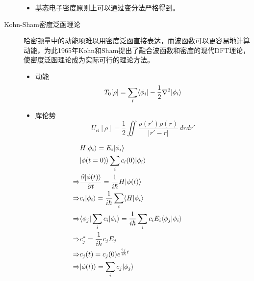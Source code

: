\begin{description}
\begin{itemize}
		\item 基态电子密度原则上可以通过变分法严格得到。

	\end{itemize}

	\item[Kohn-Sham密度泛函理论]
	哈密顿量中的动能项难以用密度泛函直接表达，而波函数可以更容易地计算动能，为此1965年Kohn和Sham提出了融合波函数和密度的现代DFT理论，使密度泛函理论成为实际可行的理论方法。

	\begin{itemize}
		\item 动能 
		\begin{equation}
		T_0[\rho]=\sum_i\langle \phi_i | -\frac{1}{2}\nabla^2 | \phi_i \rangle
		\end{equation}

		\item 库伦势
		\begin{equation}
		U_{cl}[\rho]=\frac{1}{2}\iint\frac{\rho(r')\rho(r)}{|r'-r|}\,drdr'
		\end{equation}
	\end{itemize}

\end{description}

\begin{align*}
&H| \phi_i \rangle=E_i| \phi_i \rangle\\
&| \phi(t=0) \rangle\sum_ic_i(0)| \phi_i \rangle\\
\Rightarrow & \frac{\partial | \phi(t) \rangle}{\partial t}=\frac{1}{i\hbar}H| \phi(t) \rangle\\
\Rightarrow & c_i| \phi_i \rangle=\frac{1}{i\hbar}\sum_i\langle H | \phi_i \rangle\\
\Rightarrow & \langle \phi_j | \sum_ic_i | \phi_i \rangle=\frac{1}{i\hbar}\sum_ic_iE_i\langle \phi_j | \phi_i \rangle\\
\Rightarrow & c_j^*=\frac{1}{i\hbar}c_jE_j\\
\Rightarrow & c_j(t)=c_j(0)e^{\frac{e_j}{i\hbar}t}\\
\Rightarrow & | \phi(t) \rangle=\sum_ic_j| \phi_j \rangle
\end{align*}

